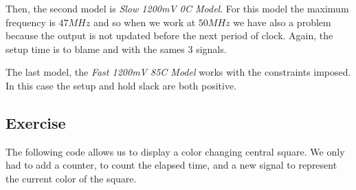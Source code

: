 \documentclass[12pt,a4paper,hyperlinks]{rapport_unif}
\begin{document}
Then, the second model is \emph{Slow 1200mV 0C Model}. For this model the maximum frequency is $47MHz$ and so when we work at $50MHz$ we have also a problem because the output is not updated before the next period of clock. Again, the setup time is to blame and with the sames 3 signals.

The last model, the \emph{Fast 1200mV 85C Model} works with the constraints imposed. In this case the setup and hold slack are both positive.

\subsection{Exercise}
The following code allows us to display a color changing  central square. We only had to add a counter, to count the elapsed time, and a new signal to represent the current color of the square.
\end{document}
